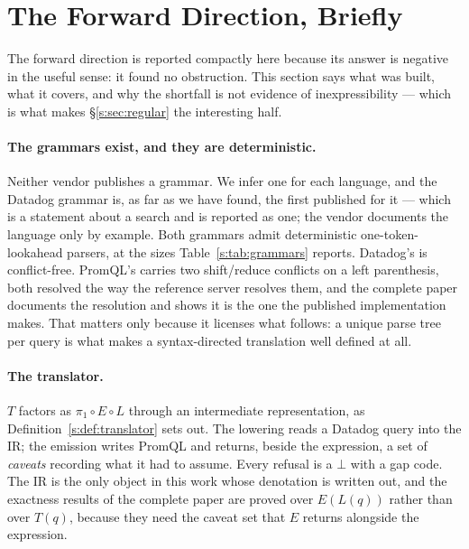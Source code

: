 
\section{The Forward Direction, Briefly}
\label{s:sec:forward}

The forward direction is reported compactly here because its answer is negative in the
useful sense: it found no obstruction. This section says what was built, what it covers,
and why the shortfall is not evidence of inexpressibility --- which is what makes
\S\ref{s:sec:regular} the interesting half.

\paragraph{The grammars exist, and they are deterministic.}
Neither vendor publishes a grammar. We infer one for each language, and the Datadog
grammar is, as far as we have found, the first published for it --- which is a statement
about a search and is reported as one; the vendor documents the language only by example.
Both grammars admit deterministic one-token-lookahead parsers, at the sizes
Table~\ref{s:tab:grammars} reports. Datadog's is conflict-free. PromQL's carries two shift/reduce conflicts on a left parenthesis, both
resolved the way the reference server resolves them, and the complete paper documents the
resolution and shows it is the one the published implementation makes. That matters only
because it licenses what follows: a unique parse tree per query is what makes a
syntax-directed translation well defined at all.

\begin{table}[htbp]\centering\footnotesize

\caption{The two inferred grammars, at the two revisions this work produced for each.
Conflicts are LALR(1) conflicts reported by the generator; Datadog's grammar has none at
either revision, and PromQL's two are the shift/reduce pair on a left parenthesis that the
reference server resolves the same way.}
\label{s:tab:grammars}
\end{table}

\paragraph{The translator.}
$T$ factors as $\pi_1\circ E\circ L$ through an intermediate representation, as
Definition~\ref{s:def:translator} sets out. The lowering reads a Datadog query into the
IR; the emission writes PromQL and returns, beside the expression, a set of
\emph{caveats} recording what it had to assume. Every refusal is a $\bot$ with a gap
code. The IR is the only object in this work whose denotation is written out, and the
exactness results of the complete paper are proved over $E(L(q))$ rather than over $T(q)$,
because they need the caveat set that $E$ returns alongside the expression.

